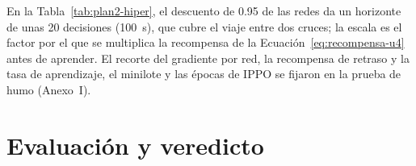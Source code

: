 
En la Tabla~\ref{tab:plan2-hiper}, el descuento de 0.95 de las redes da un horizonte de unas 20 decisiones
(100~s), que cubre el viaje entre dos cruces; la escala es el factor
por el que se multiplica la recompensa de la
Ecuación~\ref{eq:recompensa-u4} antes de aprender. El recorte del
gradiente por red, la recompensa de retraso y la tasa de aprendizaje,
el minilote y las épocas de IPPO se fijaron en la prueba de humo
(Anexo~I).


\section{Evaluación y veredicto}
\label{sec:evaluacion-veredicto}

